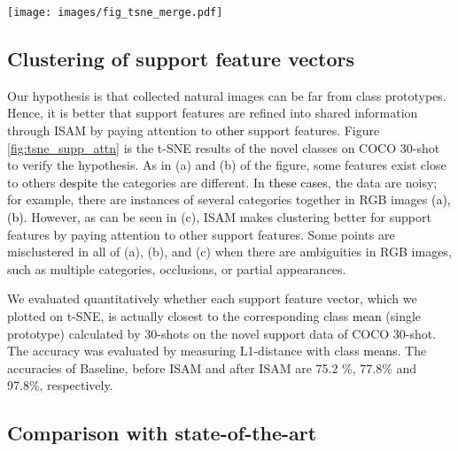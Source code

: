 \documentclass[10pt,twocolumn,letterpaper]{article}
\newcommand{\nj}[1]{\textcolor{black}{#1}}
\begin{document}
\begin{figure*}[!t]
\centering
\texttt{[image: images/fig\_tsne\_merge.pdf]}
\vspace{-0.9cm}
\caption{t-SNE visualization for 30-shot support feature vectors of MS COCO novel classes. (b) and (c) are support feature vectors before and after our ISAM, respectively. For visualization, some samples are marked with different markers (+,X,*), and only some classes are plotted. \nj{Some patches shown on the rightmost column, which are considered as misclusterd} in all of (a), (b), and (c), are circled.}
\label{fig:tsne_supp_attn}
\end{figure*}

\subsection{Clustering of support feature vectors}
\label{subsec:clustering}
\quad Our hypothesis is that collected natural images can be far from class prototypes. Hence, it is better that support features are refined into shared information through ISAM by paying attention to \nj{other} support features. Figure \ref{fig:tsne_supp_attn} is the t-SNE \cite{van2008visualizing} results of the novel classes on COCO 30-shot to verify the hypothesis. As in (a) and (b) of the figure, some features exist close to others \nj{despite} the categories are different. In \nj{these cases}, the data are noisy; for example, there are instances of several categories together in RGB images \nj{(a), (b)}. However, as can be seen in (c), ISAM makes clustering better for support features by paying attention to other support features. Some points are misclustered in all of (a), (b), and (c) when there are ambiguities in RGB images, such as multiple categories, occlusions, or partial appearances.

\vspace{+0.15cm}
 \quad We evaluated quantitatively whether each support feature vector, which we plotted on t-SNE, is actually closest to the corresponding class \nj{mean} (single prototype) calculated by 30-shots on the novel support data of COCO 30-shot. The accuracy was evaluated by measuring L1-distance with class \nj{means}. The accuracies of Baseline, before ISAM and after ISAM are 75.2 \%, 77.8\% and 97.8\%, respectively. 






\subsection{Comparison with state-of-the-art}
\label{subsec:quant}
\end{document}
